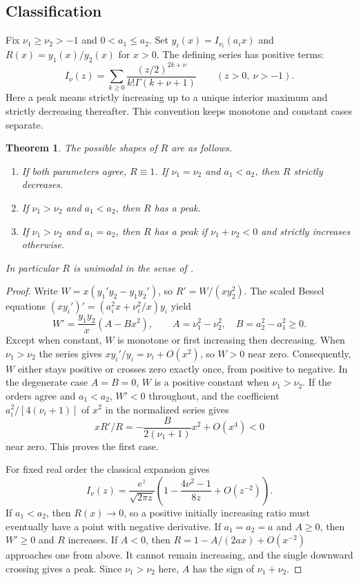 \documentclass[11pt,a4paper]{article}
\newtheorem{SourceRceHbtheorem}{Theorem}
\begin{document}
\subsection{Classification}
Fix $\nu_1\ge\nu_2>-1$ and $0<a_1\le a_2$. Set
$y_i(x)=I_{\nu_i}(a_ix)$ and $R(x)=y_1(x)/y_2(x)$ for $x>0$.
The defining series has positive terms:
\[
 I_\nu(z)=\sum_{k\ge0}\frac{(z/2)^{2k+\nu}}{k!\Gamma(k+\nu+1)}\qquad(z>0,\ \nu>-1).
\]
Here a peak means strictly increasing up to a unique interior maximum
and strictly decreasing thereafter. This convention keeps monotone
and constant cases separate.
\begin{SourceRceHbtheorem}\label{R24Hb:main}
The possible shapes of $R$ are as follows.
\begin{enumerate}
\item If both parameters agree, $R\equiv1$. If $\nu_1=\nu_2$ and $a_1<a_2$, then $R$ strictly decreases.
\item If $\nu_1>\nu_2$ and $a_1<a_2$, then $R$ has a peak.
\item If $\nu_1>\nu_2$ and $a_1=a_2$, then $R$ has a peak if
$\nu_1+\nu_2<0$ and strictly increases otherwise.
\end{enumerate}
In particular $R$ is unimodal in the sense of \cite[Conjecture 1]{R24Hq:KVZ}.
\end{SourceRceHbtheorem}
\begin{proof}
Write $W=x(y_1'y_2-y_1y_2')$, so $R'=W/(xy_2^2)$.
The scaled Bessel equations $(xy_i')'=(a_i^2x+\nu_i^2/x)y_i$ yield
\[
 W'=\frac{y_1y_2}{x}(A-Bx^2),\qquad
 A=\nu_1^2-\nu_2^2,\quad B=a_2^2-a_1^2\ge0 .
\]
Except when constant, $W$ is monotone or first increasing then
decreasing. When $\nu_1>\nu_2$ the series gives
$xy_i'/y_i=\nu_i+O(x^2)$, so $W>0$ near zero.
Consequently, $W$ either stays positive or crosses zero exactly once,
from positive to negative. In the degenerate case $A=B=0$, $W$ is a
positive constant when $\nu_1>\nu_2$. If the orders agree and $a_1<a_2$,
$W'<0$ throughout, and the coefficient $a_i^2/[4(\nu_i+1)]$ of
$x^2$ in the normalized series gives
\[
  xR'/R=-\frac{B}{2(\nu_1+1)}x^2+O(x^4)<0
\]
near zero. This proves the first case.

For fixed real order the classical expansion \cite[10.40.1]{R24Hb:DLMF} gives
\[
 I_\nu(z)=\frac{e^z}{\sqrt{2\pi z}}\left(1-\frac{4\nu^2-1}{8z}+O(z^{-2})\right).
\]
If $a_1<a_2$, then $R(x)\to0$, so a positive initially increasing
ratio must eventually have a point with negative derivative. If
$a_1=a_2=a$ and $A\ge0$, then $W'\ge0$ and $R$ increases. If $A<0$,
then $R=1-A/(2ax)+O(x^{-2})$ approaches one from above. It cannot
remain increasing, and the single downward crossing gives a peak.
Since $\nu_1>\nu_2$ here, $A$ has the sign of $\nu_1+\nu_2$.
\end{proof}
\end{document}

